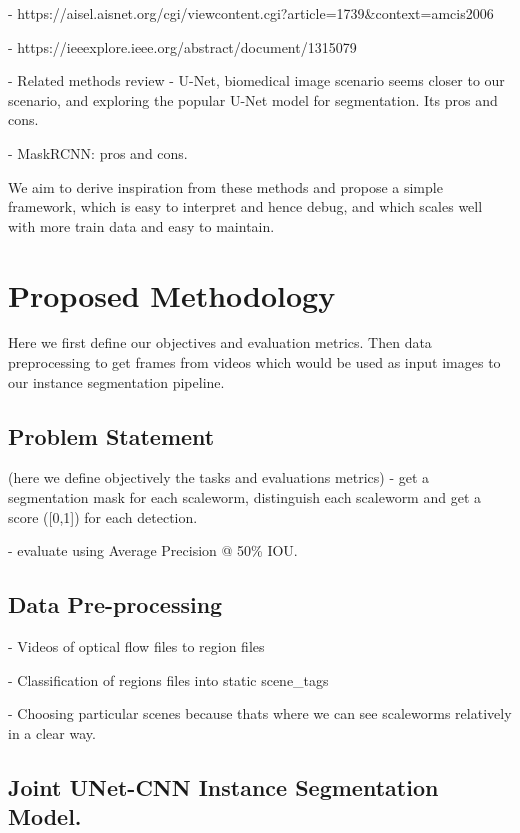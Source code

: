 \documentclass[10pt,twocolumn,letterpaper]{article}
\begin{document}
    - https://aisel.aisnet.org/cgi/viewcontent.cgi?article=1739&context=amcis2006
 
    - https://ieeexplore.ieee.org/abstract/document/1315079

- Related methods review
    - U-Net, biomedical image scenario seems closer to our scenario, and exploring the popular U-Net model for segmentation. Its pros and cons.

    - MaskRCNN: pros and cons.

    We aim to derive inspiration from these methods and propose a simple framework, which is easy to interpret and hence debug, and which scales well with more train data and easy to maintain.

\section{Proposed Methodology}

Here we first define our objectives and evaluation metrics. Then data preprocessing to get frames from videos which would be used as input images to our instance segmentation pipeline. 

\subsection{Problem Statement}
(here we define objectively the tasks and evaluations metrics)
- get a segmentation mask for each scaleworm, distinguish each scaleworm and get a score ([0,1]) for each detection.

- evaluate using Average Precision @ 50\% IOU.

\subsection{Data Pre-processing}
- Videos of optical flow files to region files

- Classification of regions files into static scene_tags

- Choosing particular scenes because thats where we can see scaleworms relatively in a clear way. 

\subsection{Joint UNet-CNN Instance Segmentation Model.}
\end{document}
